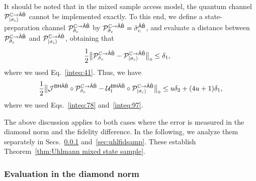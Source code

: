 It should be noted that in the mixed sample access model, the quantum channel ${\mathcal{P}}_{|\sigma_{\rm c}\rangle}^{\mathbb{C}\rightarrow\hat{{\mathsf{A}}}\hat{{\mathsf{B}}}}$ cannot be implemented exactly.
To this end, we define a state-preparation channel ${\mathcal{P}}_{\tilde{\sigma}_{\rm c}}^{\mathbb{C}\rightarrow\hat{{\mathsf{A}}}\hat{{\mathsf{B}}}}$ by ${\mathcal{P}}_{\tilde{\sigma}_{\rm c}}^{\mathbb{C}\rightarrow\hat{{\mathsf{A}}}\hat{{\mathsf{B}}}} = \tilde{\sigma}_{\rm c}^{\hat{{\mathsf{A}}}\hat{{\mathsf{B}}}}$, and evaluate a distance between ${\mathcal{P}}_{\tilde{\sigma}_{\rm c}}^{\mathbb{C}\rightarrow\hat{{\mathsf{A}}}\hat{{\mathsf{B}}}}$ and ${\mathcal{P}}_{|\sigma_{\rm c}\rangle}^{\mathbb{C}\rightarrow\hat{{\mathsf{A}}}\hat{{\mathsf{B}}}}$, obtaining that
\begin{align}
\label{inteq:97}
    \frac{1}{2}\big\|{\mathcal{P}}_{\tilde{\sigma}_{\rm c}}^{\mathbb{C}\rightarrow\hat{{\mathsf{A}}}\hat{{\mathsf{B}}}} - {\mathcal{P}}_{|\sigma_{\rm c}\rangle}^{\mathbb{C}\rightarrow\hat{{\mathsf{A}}}\hat{{\mathsf{B}}}}\big\|_\diamond 
    &\leq \delta_1,
\end{align}
where we used Eq.~\eqref{inteq:41}.
Thus, we have 
\begin{align}
\label{inteq:100}
    \frac{1}{2}\big\|{\mathcal{J}}^{{\mathsf{B}}{\mathsf{H}}\hat{{\mathsf{A}}}\hat{{\mathsf{B}}}}\circ{\mathcal{P}}_{\tilde{\sigma}_{\rm c}}^{\mathbb{C}\rightarrow\hat{{\mathsf{A}}}\hat{{\mathsf{B}}}} - {\mathcal{U}}_1^{{\mathsf{B}}{\mathsf{H}}\hat{{\mathsf{A}}}\hat{{\mathsf{B}}}}\circ{\mathcal{P}}_{|\sigma_{\rm c}\rangle}^{\mathbb{C}\rightarrow\hat{{\mathsf{A}}}\hat{{\mathsf{B}}}}\big\|_\diamond
    \leq u\delta_2 + (4u+1)\delta_1,
\end{align}
where we used Eqs.~\eqref{inteq:78} and~\eqref{inteq:97}.


The above discussion applies to both cases where the error is measured in the diamond norm and the fidelity difference.
In the following, we analyze them separately in Secs.~\ref{sec:mixed sample diamond} and~\ref{sec:uhlfidsamp}. These establish Theorem~\ref{thm:Uhlmann mixed state sample}.








\subsubsection{Evaluation in the diamond norm}
\label{sec:mixed sample diamond}




